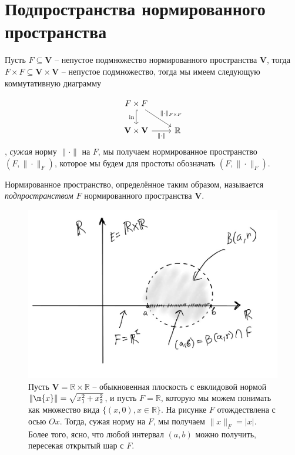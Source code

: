 \section{Подпространства нормированного пространства}

Пусть $F \subseteq \mathbf{V}$ -- непустое подмножество нормированного пространства $\mathbf{V}$, тогда $F \times F \subseteq \mathbf{V} \times \mathbf{V}$ -- непустое подмножество, тогда мы имеем следующую коммутативную диаграмму

\[
  \begin{tikzcd}
    F \times F \arrow[hook]{d}[left]{\mathrm{in}} \arrow{dr}{\|\cdot\|_{F \times F}} &  \\
    \mathbf{V} \times \mathbf{V} \arrow{r}[below]{\|\cdot\|} & \mathbb{R}
  \end{tikzcd}
\]
\ie, \textit{сужая} норму $\|\cdot\|$ на $F$, мы получаем нормированное пространство $(F,\|\cdot\|_{F})$, которое мы будем для простоты обозначать $(F, \|\cdot\|_F)$.

\begin{definition}
    Нормированное пространство, определённое таким образом, называется \textit{подпространством} $F$ нормированного пространства $\mathbf{V}$.
\end{definition}

\begin{figure}[h!]
    \centering
    \includegraphics[scale = 0.4]{images/open_in_F.jpg}
    \caption{Пусть $\mathbf{V} = \mathbb{R} \times \mathbb{R}$ -- обыкновенная плоскость с евклидовой нормой $\|\m{x}\| = \sqrt{x_1^2 + x_2^2}$, и пусть $F = \mathbb{R}$, которую мы можем понимать как множество вида $\{(x,0), x\in \mathbb{R}\}$. На рисунке $F$ отождествлена с осью $Ox$. Тогда, сужая норму на $F$, мы получаем $\|x\|_F = |x|$. Более того, ясно, что любой интервал $(a,b)$ можно получить, пересекая открытый шар с $F.$}
    \label{fig:enter-label}
\end{figure}


